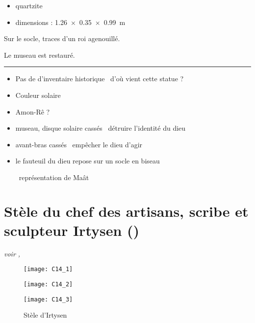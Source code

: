 \documentclass[dvipsnames,a4paper,twoside,10pt,openany,article]{memoir}
\newcommand{\separation}{%
  {\noi\hspace*{\fill}\rule{.33\textwidth}{1pt}\hspace*{\fill}}%
}
\begin{document}
\begin{itemize}
  \item quartzite
  \item dimensions : \SI{1.26x0.35x0.99}{\m}
\end{itemize}

Sur le socle, traces d'un roi agenouillé.

Le museau est restauré.

\separation

\begin{itemize}
  \item Pas de \no d'inventaire historique \donc~d'où vient 
        cette statue ?
  \item Couleur solaire
  \item Amon-Rê ?
  \item museau, disque solaire cassés \donc~détruire l'identité du dieu
  \item avant-bras cassés \donc~empêcher le dieu d'agir
  \item le fauteuil du dieu repose sur un socle en biseau 
        \begin{hieroglyph}{\leavevmode {}}\end{hieroglyph} 
        \donc~représentation de Maât
\end{itemize}


\chapter{Stèle du chef des artisans, scribe et sculpteur Irtysen 
         ()}
\label{sec:C14}

\puceb{} \emph{voir , }
\bigskip

\begin{figure}[!h]
  \noi\begin{minipage}[m]{6cm}
    \centerfloat
    \texttt{[image: C14\_1]}
  \end{minipage}%
  \qquad%
  \begin{minipage}[m]{6cm}
    \centerfloat
    \texttt{[image: C14\_2]}

    \bigskip

    \texttt{[image: C14\_3]}
  \end{minipage}
  \caption{Stèle d'Irtysen }
  \label{fig:C14}
\end{figure}
\end{document}
